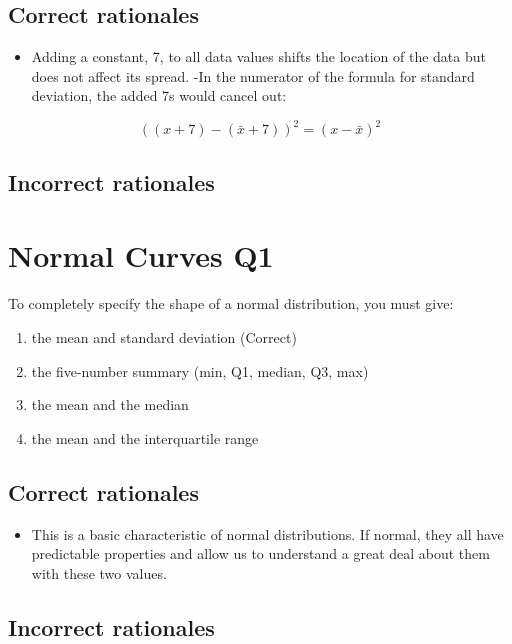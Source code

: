 \documentclass[letterpaper,9pt,twoside,printwatermark=false]{pinp}
\providecommand{\tightlist}{%
  \setlength{\itemsep}{0pt}\setlength{\parskip}{0pt}}
\begin{document}
\subsection{Correct rationales}\label{correct-rationales-4}

\begin{itemize}
\tightlist
\item
  Adding a constant, 7, to all data values shifts the location of the
  data but does not affect its spread. -In the numerator of the formula
  for standard deviation, the added 7s would cancel out:
\end{itemize}

\[((x+7)-(\bar{x}+7))^2 = (x-\bar{x})^2\]

\subsection{Incorrect rationales}\label{incorrect-rationales-4}

\section{Normal Curves Q1}\label{normal-curves-q1}

To completely specify the shape of a normal distribution, you must give:

\begin{enumerate}
\def\labelenumi{\alph{enumi})}
\tightlist
\item
  the mean and standard deviation (Correct)
\item
  the five-number summary (min, Q1, median, Q3, max)
\item
  the mean and the median
\item
  the mean and the interquartile range
\end{enumerate}

\subsection{Correct rationales}\label{correct-rationales-5}

\begin{itemize}
\tightlist
\item
  This is a basic characteristic of normal distributions. If normal,
  they all have predictable properties and allow us to understand a
  great deal about them with these two values.
\end{itemize}

\subsection{Incorrect rationales}\label{incorrect-rationales-5}
\end{document}
